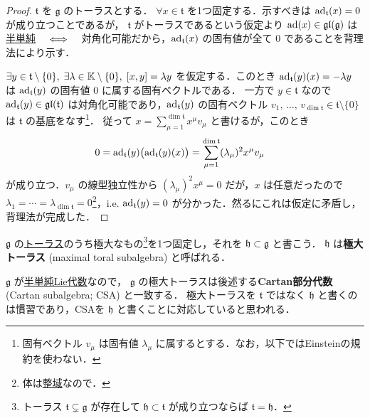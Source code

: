 \documentclass[rep_main]{subfiles}
\begin{document}
\begin{proof}
	$\mathfrak{t}$ を $\mathfrak{g}$ のトーラスとする．
	$\forall x \in \mathfrak{t}$ を1つ固定する．示すべきは $\operatorname{ad}_{\mathfrak{t}} (x) = 0$ が成り立つことであるが，
	$\mathfrak{t}$ がトーラスであるという仮定より $\operatorname{ad} (x) \in \mathfrak{gl} (\mathfrak{g})$ は\hyperref[def:semisimple-end]{半単純} $\quad \Longleftrightarrow \quad$ 対角化可能だから，$\operatorname{ad}_{\mathfrak{t}}(x)$ の固有値が全て $0$ であることを背理法により示す．

	$\exists y \in \mathfrak{t} \setminus \{0\},\; \exists \lambda \in \mathbb{K} \setminus \{0\},\; \comm{x}{y} = \lambda y$ を仮定する．このとき $\operatorname{ad}_{\mathfrak{t}}(y)(x) = -\lambda y$ は $\operatorname{ad}_{\mathfrak{t}}(y)$ の固有値 $0$ に属する固有ベクトルである．
	一方で $y \in \mathfrak{t}$ なので $\operatorname{ad}_{\mathfrak{t}}(y) \in \mathfrak{gl}(\mathfrak{t})$ は対角化可能であり，$\operatorname{ad}_{\mathfrak{t}}(y)$ の固有ベクトル $v_1,\, \dots,\, v_{\dim \mathfrak{t}} \in \mathfrak{t} \setminus \{0\}$ は $\mathfrak{t}$ の基底をなす\footnote{固有ベクトル $v_\mu$ は固有値 $\lambda_\mu$ に属するとする．なお，以下ではEinsteinの規約を使わない．}． 
	従って $x = \sum_{\mu=1}^{\dim \mathfrak{t}} x^\mu v_\mu$ と書けるが，このとき
	\begin{align}
		0 = \operatorname{ad}_{\mathfrak{t}} (y) \bigl(\operatorname{ad}_{\mathfrak{t}}(y)(x)\bigr) &= \sum_{\mu=1}^{\dim \mathfrak{t}} (\lambda_\mu)^2 x^\mu v_\mu 
	\end{align}
	が成り立つ．$v_\mu$ の線型独立性から $(\lambda_\mu)^2 x^\mu = 0$ だが，$x$ は任意だったので $\lambda_1 = \cdots = \lambda_{\dim \mathfrak{t}} = 0$\footnote{体は\hyperref[def:domain-basic]{整域}なので．}，i.e. $\operatorname{ad}_{\mathfrak{t}}(y) = 0$ が分かった．然るにこれは仮定に矛盾し，背理法が完成した．
\end{proof}

	

$\mathfrak{g}$ の\hyperref[def:toral-subLieAlg]{トーラス}のうち極大なもの\footnote{トーラス $\mathfrak{t} \subsetneq \mathfrak{g}$ が存在して $\mathfrak{h} \subset \mathfrak{t}$ が成り立つならば $\mathfrak{t} = \mathfrak{h}$．}を1つ固定し，それを $\mathfrak{h} \subset \mathfrak{g}$ と書こう．
$\mathfrak{h}$ は\textbf{極大トーラス} (maximal toral subalgebra) と呼ばれる．
\begin{marker}
	$\mathfrak{g}$ が\hyperref[def:semisimple-LieAlg]{半単純Lie代数}なので， $\mathfrak{g}$ の極大トーラスは後述する\textbf{Cartan部分代数} (Cartan subalgebra; CSA) と一致する．
	極大トーラスを $\mathfrak{t}$ ではなく $\mathfrak{h}$ と書くのは慣習であり，CSAを $\mathfrak{h}$ と書くことに対応していると思われる．
\end{marker}
\end{document}
